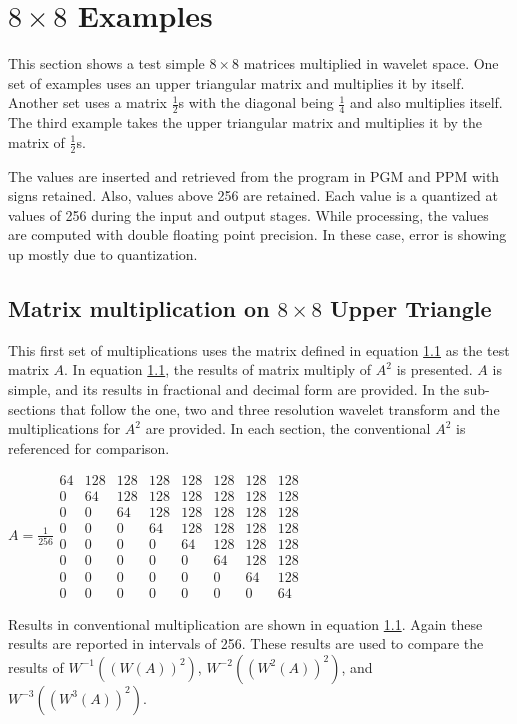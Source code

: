 \documentclass{article}
\begin{document}
\section{$8\times 8$ Examples}
This section shows a test simple $8\times 8$ matrices multiplied in wavelet space.  One set of examples uses an upper triangular matrix and multiplies it by itself.  Another set uses a matrix $\frac{1}{2}$s with the diagonal being $\frac{1}{4}$ and also multiplies itself.  The third example takes the upper triangular matrix and multiplies it by the matrix of $\frac{1}{2}$s.   

The values are inserted and retrieved from the program in PGM and PPM with signs retained.  Also, values above 256 are retained.  Each value is a quantized at values of 256 during the input and output stages.  While processing, the values are computed with double floating point precision.  In these case, error is showing up mostly due to quantization.  

\subsection{Matrix multiplication on $8\times 8$ Upper Triangle}
This first set of multiplications uses the matrix defined in equation \ref{} as the test matrix $A$.   In equation \ref{}, the results of matrix multiply of $A^2$ is presented.  $A$ is simple, and its results in fractional and decimal form are provided.  In the sub-sections that follow the one, two and three resolution wavelet transform and the multiplications for $A^2$ are provided.  In each section, the conventional $A^2$ is referenced for comparison.   

$A= \frac{1}{256} 
\begin{array}{cccccccc}
64 & 128 & 128 & 128 & 128 & 128 & 128 & 128 \\ 
0 & 64 & 128 & 128 & 128 & 128 & 128 & 128 \\ 
0 & 0 & 64 & 128 & 128 & 128 & 128 & 128 \\ 
0 & 0 & 0 & 64 & 128 & 128 & 128 & 128 \\ 
0 & 0 & 0 & 0 & 64 & 128 & 128 & 128 \\ 
0 & 0 & 0 & 0 & 0 & 64 & 128 & 128 \\ 
0 & 0 & 0 & 0 & 0 & 0 & 64 & 128 \\ 
0 & 0 & 0 & 0 & 0 & 0 & 0 & 64
\end{array}
$

Results in conventional multiplication are shown in equation \ref{}.  Again these results are reported in intervals of 256.  These results are used to compare the results of $W^{-1}((W(A))^2)$, $W^{-2}((W^2(A))^2)$, and $W^{-3}((W^3(A))^2)$.
\end{document}
